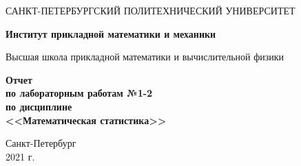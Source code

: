 \begin{titlepage}
   \begin{center}
       \vspace*{3cm}
       \large{САНКТ-ПЕТЕРБУРГСКИЙ ПОЛИТЕХНИЧЕСКИЙ УНИВЕРСИТЕТ}
       \vspace{0.4 cm}
       
       \large\textbf{Институт прикладной математики и механики}
       \vspace{0.4 cm}
       
       \large{Высшая школа прикладной математики и вычислительной физики}
       
       \vspace{3 cm}
       \normalsize\textbf{Отчет\\ по лабораторным работам №1-2 \\ по дисциплине \\ <<Математическая статистика>>}
       \vfill
            
       \vspace{0.8cm}
     
            
       \normalsize{Санкт-Петербург\\2021 г.}
            
   \end{center}
\end{titlepage}